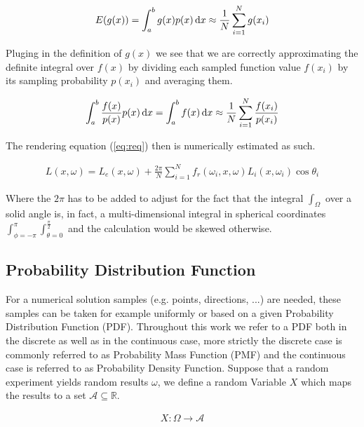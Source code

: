 \begin{align}
E(g(x)) = \int_a^b g(x)p(x)\mathop{}\!\mathrm{d} x \approx \frac{1}{N} \sum_{i=1}^{N} g(x_i) 
\end{align}

Pluging in the definition of $g(x)$ we see that we are correctly approximating the definite integral over $f(x)$ by dividing each sampled function value $f(x_i)$ by its sampling probability $p(x_i)$ and averaging them.

\begin{align}
\label{eq:mci}
\int_a^b \frac{f(x)}{p(x)}p(x)\mathop{}\!\mathrm{d} x = \int_a^b f(x) \mathop{}\!\mathrm{d} x \approx \frac{1}{N} \sum_{i=1}^{N} \frac{f(x_i)}{p(x_i)}
\end{align}


The rendering equation (\ref{eq:req}) then is numerically estimated as such.

\begin{align}
\label{eq:reqmc}
L(x, \omega) =  L_e(x, \omega) + \frac{2\pi}{N} \sum_{i=1}^{N} f_r(\omega_i, x, \omega) L_i(x, \omega_i)\cos\theta_i
\end{align}

Where the $2\pi$ has to be added to adjust for the fact that the integral $\int_\Omega$ over a solid angle is, in fact, a multi-dimensional integral in spherical coordinates $\int_{\phi = -\pi}^{\pi}\int_{\theta=0}^{\frac{\pi}{2}}$ and the calculation would be skewed otherwise. 

\subsection{Probability Distribution Function}
\label{sec:PDF}

For a numerical solution samples (e.g. points, directions, ...) are needed, these samples can be taken for example uniformly or based on a given Probability Distribution Function (PDF). Throughout this work we refer to a PDF both in the discrete as well as in the continuous case, more strictly the discrete case is commonly referred to as Probability Mass Function (PMF) and the continuous case is referred to as Probability Density Function. Suppose that a random experiment yields random results $\omega$, we define a random Variable $X$ which maps the results to a set $\mathcal{A} \subseteq \mathbb{R}$.

\begin{align}
X: \Omega \rightarrow \mathcal{A}
\end{align}

